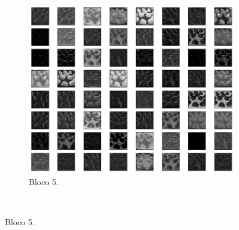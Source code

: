 \begin{figure}[p]
\begin{subfigure}[t]{0.45\textwidth}
         \includegraphics[width=1\linewidth]{recursos/imagens/results/max1.png}
         \caption{Bloco 5.}
         \label{results:fig:datasets:max.1}
     \end{subfigure}%
     ~ 
 

\end{figure}
